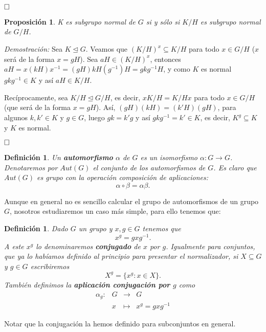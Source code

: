 \documentclass[12pt]{article}
\newtheorem{proposition}[theorem]{Proposición}
\newtheorem{definition}[theorem]{Definición}
\begin{document}
$\hfill \square$

\begin{proposition}\label{eq:ej32} K es subgrupo normal de $G$ si y sólo si $K/H$ es subgrupo normal de $G/H$.\end{proposition}

\emph{Demostración: }Sea $K \unlhd G$. Veamos que $(K/H)^x \subseteq K/H$ para todo $x \in G/H$ ($x$ será de la forma $x=gH$). Sea $aH \in (K/H)^x$, entonces $aH = x(kH)x^{-1} = (gH)kH(g^{-1})H = gkg^{-1}H$, y como $K$ es normal $gkg^{-1} \in K$ y así $aH \in K/H$.

Recíprocamente, sea $K/H \unlhd G/H$, es decir, $xK/H = K/Hx$ para todo $x \in G/H$ (que será de la forma $x =gH$). Así, $(gH)(kH) = (k'H)(gH)$, para algunos $k,k' \in K$ y $g\in G$, luego $gk = k'g$ y así $gkg^{-1} = k' \in K$, es decir, $K^g \subseteq K$ y $K$ es normal. 

$\hfill \square$

\begin{definition}Un \textbf{automorfismo} $\alpha$ de $G$ es un isomorfismo $\alpha \colon G \longrightarrow G$. Denotaremos por $Aut(G)$ el conjunto de los automorfismos de $G$. Es claro que $Aut(G)$ es grupo con la operación composición de aplicaciones: $$\alpha \circ \beta = \alpha \beta.$$
\end{definition}

Aunque en general no es sencillo calcular el grupo de automorfismos de un grupo $G$, nosotros estudiaremos un caso más simple, para ello tenemos que:

\begin{definition} Dado $G$ un grupo y $x,g \in G$ tenemos que $$x^g=gxg^{-1}.$$ A este $x^g$ lo denominaremos \textbf{conjugado} de $x$ por $g$. Igualmente para conjuntos, que ya lo habíamos definido al principio para presentar el normalizador, si $X \subseteq G$ y $g \in G$ escribiremos $$X^g = \lbrace x^g:x \in X \rbrace.$$ También definimos la \textbf{aplicación conjugación por $g$} como $$\begin{array}{rccl}
\alpha_g \colon &G&\longrightarrow &G \\
&x& \longmapsto &x^g = gxg^{-1}
\end{array}
$$
\end{definition}

Notar que la conjugación la hemos definido para subconjuntos en general.
\end{document}
